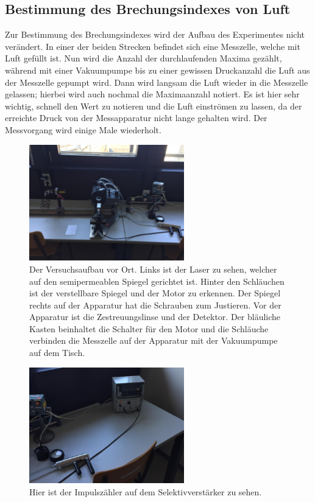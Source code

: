 \subsection{Bestimmung des Brechungsindexes von Luft}
Zur Bestimmung des Brechungsindexes wird der Aufbau des Experimentes nicht verändert. In einer der beiden Strecken befindet sich eine Messzelle, welche mit Luft gefüllt ist.
Nun wird die Anzahl der durchlaufenden Maxima gezählt, während mit einer Vakuumpumpe bis zu einer gewissen Druckanzahl die Luft aus der Messzelle gepumpt wird.
Dann wird langsam die Luft wieder in die Messzelle gelassen; hierbei wird auch nochmal die Maximaanzahl notiert. Es ist hier sehr wichtig, schnell den Wert zu notieren und die Luft einströmen zu lassen, 
da der erreichte Druck von der Messapparatur nicht lange gehalten wird. Der Messvorgang wird einige Male wiederholt.

\begin{figure}
    \centering
    \includegraphics[width=0.6\textwidth]{content/aufbaufoto1.jpeg}
    \caption{Der Versuchsaufbau vor Ort. Links ist der Laser zu sehen, welcher auf den semipermeablen Spiegel gerichtet ist. Hinter den Schläuchen ist der verstellbare
    Spiegel und der Motor zu erkennen. Der Spiegel rechts auf der Apparatur hat die Schrauben zum Justieren. Vor der Apparatur ist die Zestreuungslinse und der Detektor.
    Der bläuliche Kasten beinhaltet die Schalter für den Motor und die Schläuche verbinden die Messzelle auf der Apparatur mit der Vakuumpumpe auf dem Tisch.}
\end{figure}

\begin{figure}
    \centering
    \includegraphics[width=0.6\textwidth]{content/aufbaufoto2.jpeg}
    \caption{Hier ist der Impulszähler auf dem Selektivverstärker zu sehen.}
\end{figure}
